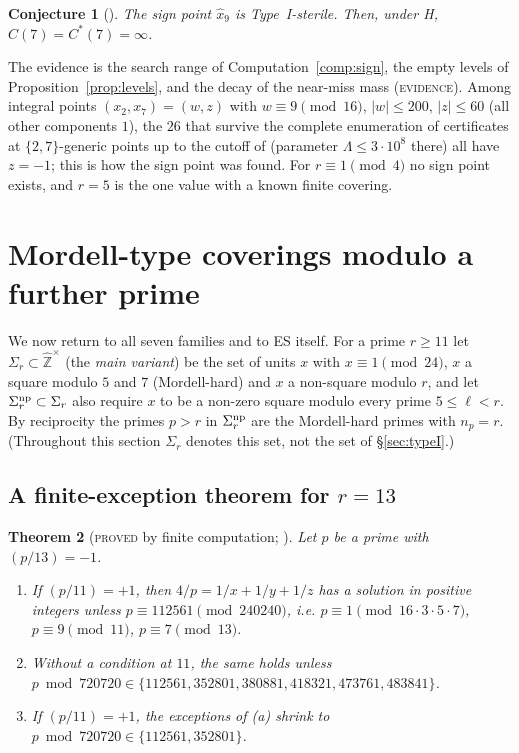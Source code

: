 \documentclass[11pt,reqno]{amsart}
\newtheorem{theorem}{Theorem}[section]
\newtheorem{conjecture}[theorem]{Conjecture}
\theoremstyle{definition}
\newcommand{\Z}{\mathbb Z}
\newcommand{\Zhu}{\widehat{\Z}^{\times}}
\newcommand{\status}[1]{\textup{\textsc{#1}}}
\begin{document}
\begin{conjecture}[{\cite[Conj.~3.4]{PT2}}]\label{conj:sign}
The sign point $\hat x_9$ is Type~I-sterile.  Then, under H,
$C(7)=C^*(7)=\infty$.
\end{conjecture}

The evidence is the search range of Computation~\ref{comp:sign}, the
empty levels of Proposition~\ref{prop:levels}, and the decay of the
near-miss mass (\status{evidence}).  Among integral points
$(x_2,x_7)=(w,z)$ with $w\equiv9\pmod{16}$, $|w|\le200$, $|z|\le60$ (all
other components $1$), the $26$ that survive the complete enumeration of certificates at
$\{2,7\}$-generic points up to the cutoff of \cite[\S2.2]{PT2} (parameter
$\Lambda\le3\cdot10^8$ there) all have $z=-1$; this is how the
sign point was found.  For $r\equiv1\pmod 4$ no sign point exists, and
$r=5$ is the one value with a known finite covering.

\section{Mordell-type coverings modulo a further prime}\label{sec:mordell}

We now return to all seven families and to ES itself.  For a prime $r\ge
11$ let $\Sigma_r\subset\Zhu$ (the \emph{main variant}) be the set of
units $x$ with $x\equiv1\pmod{24}$, $x$ a square modulo $5$ and $7$
(Mordell-hard) and $x$ a non-square modulo $r$, and let
$\Sigma_r^{\rm np}\subset\Sigma_r$ also require $x$ to be a non-zero square
modulo every prime $5\le\ell<r$.  By reciprocity the primes $p>r$ in
$\Sigma_r^{\rm np}$ are the Mordell-hard primes with $n_p=r$.
(Throughout this section $\Sigma_r$ denotes this set, not the set of
\S\ref{sec:typeI}.)

\subsection{A finite-exception theorem for $r=13$}

\begin{theorem}[\status{proved} by finite computation; {\cite[Thm.~3.1]{PM}}]\label{thm:r13}
Let $p$ be a prime with $(p/13)=-1$.
\begin{enumerate}
\item[(a)] If $(p/11)=+1$, then $4/p=1/x+1/y+1/z$ has a solution in
positive integers unless $p\equiv112561\pmod{240240}$, i.e.
$p\equiv1\pmod{16\cdot3\cdot5\cdot7}$, $p\equiv9\pmod{11}$,
$p\equiv7\pmod{13}$.
\item[(b)] Without a condition at $11$, the same holds unless
$p\bmod720720\in\{112561,352801,380881,418321,473761,483841\}$.
\item[(c)] If $(p/11)=+1$, the exceptions of (a) shrink to $p\bmod
720720\in\{112561,352801\}$.
\end{enumerate}
\end{theorem}
\end{document}
